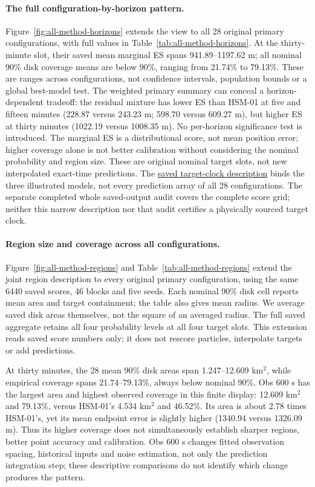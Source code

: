 \paragraph{The full configuration-by-horizon pattern.}
Figure~\ref{fig:all-method-horizons} extends the view to all 28 original
primary configurations, with full values in Table~\ref{tab:all-method-horizons}.
At the thirty-minute slot, their saved mean marginal ES spans 941.89--1197.62 m;
all nominal 90\% disk coverage means are below 90\%, ranging from
21.74\% to 79.13\%. These are ranges across configurations, not confidence
intervals, population bounds or a global best-model test.
The weighted primary summary can conceal a horizon-dependent tradeoff:
the residual mixture has lower ES than HSM-01 at five and fifteen minutes
(228.87 versus 243.23 m; 598.70 versus 609.27 m), but higher ES at thirty
minutes (1022.19 versus 1008.35 m). No per-horizon significance test is
introduced. The marginal ES is a distributional score, not mean position
error; higher coverage alone is not better calibration without considering
the nominal probability and region size.
These are original nominal target slots, not new interpolated exact-time
predictions. The \hyperref[sec:target-times]{saved target-clock description}
binds the three illustrated models,
not every prediction array of all 28 configurations. The separate completed
whole saved-output audit covers the complete score grid; neither this narrow
description nor that audit certifies a physically sourced target clock.


\FloatBarrier
\paragraph{Region size and coverage across all configurations.}
Figure~\ref{fig:all-method-regions} and Table~\ref{tab:all-method-regions}
extend the joint region description to every original primary configuration,
using the same 6440 saved scores, 46 blocks and five seeds. Each nominal
90\% disk cell reports mean area and target containment; the table also gives
mean radius. We average saved disk areas themselves, not the square of an
averaged radius. The full saved aggregate retains all four probability levels
at all four target slots. This extension reads saved score numbers only;
it does not rescore particles, interpolate targets or add predictions.

At thirty minutes, the 28 mean 90\% disk areas span 1.247--12.609 km\(^{2}\),
while empirical coverage spans 21.74--79.13\%, always below nominal 90\%.
Obs 600 s has the largest area and highest observed coverage in this finite
display: 12.609 km\(^{2}\) and 79.13\%, versus HSM-01's 4.534 km\(^{2}\)
and 46.52\%. Its area is about 2.78 times HSM-01's, yet its mean endpoint
error is slightly higher (1340.94 versus 1326.09 m). Thus its higher coverage
does not simultaneously establish sharper regions, better point accuracy
and calibration. Obs 600 s changes fitted observation spacing, historical inputs
and noise estimation, not only the prediction integration step; these
descriptive comparisons do not identify which change produces the pattern.

